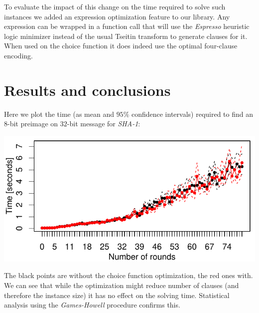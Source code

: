 \documentclass[myposter,portrait]{sciposter}
\def\mysection#1{
{\color{sectionCol}\section*{\sc\bfseries #1}}}
\begin{document}
\begin{multicols*}{3}
To evaluate the impact of this change on the time required to solve such instances we added an expression optimization feature to our library.
Any expression can be wrapped in a function call that will use the \emph{Espresso} heuristic logic minimizer instead of the usual Tseitin transform to generate clauses for it.
When used on the choice function it does indeed use the optimal four-clause encoding.
%
%
%

\mysection{Results and conclusions}
Here we plot the time (as mean and $95\%$ confidence intervals) required to find an $8$-bit preimage on $32$-bit message for \emph{SHA-1}:

\includegraphics[width=\columnwidth]{figures/opt-sha1/sha1-32bit-8bitref-cmp-espresso-sq-lin.pdf}

The black points are without the choice function optimization, the red ones with.
We can see that while the optimization might reduce number of clauses (and therefore the instance size) it has no effect on the solving time.
Statistical analysis using the \emph{Games-Howell} procedure \cite{games1976pairwise} confirms this.
~\\


\end{multicols*}
\end{document}
